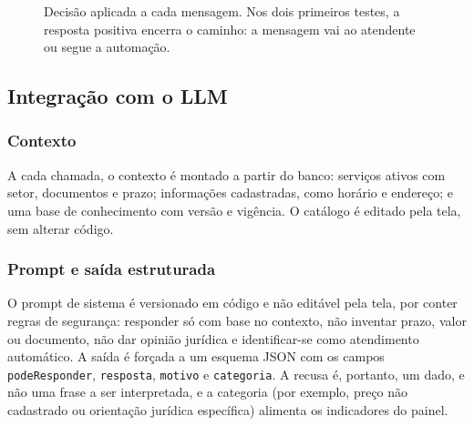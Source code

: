 \documentclass[conference]{IEEEtran}
\begin{document}
\begin{figure}[t]
\centering
{}
\caption{Decisão aplicada a cada mensagem. Nos dois primeiros testes, a resposta positiva encerra o caminho: a mensagem vai ao atendente ou segue a automação.}
\label{fig:fluxo}
\end{figure}

\subsection{Integração com o LLM}

\subsubsection{Contexto}
A cada chamada, o contexto é montado a partir do banco: serviços ativos com setor, documentos e prazo; informações cadastradas, como horário e endereço; e uma base de conhecimento com versão e vigência. O catálogo é editado pela tela, sem alterar código.

\subsubsection{Prompt e saída estruturada}
O prompt de sistema é versionado em código e não editável pela tela, por conter regras de segurança: responder só com base no contexto, não inventar prazo, valor ou documento, não dar opinião jurídica e identificar-se como atendimento automático. A saída é forçada a um esquema JSON com os campos \texttt{podeResponder}, \texttt{resposta}, \texttt{motivo} e \texttt{categoria}. A recusa é, portanto, um dado, e não uma frase a ser interpretada, e a categoria (por exemplo, preço não cadastrado ou orientação jurídica específica) alimenta os indicadores do painel.
\end{document}
